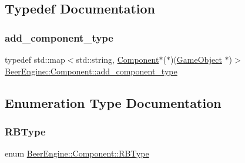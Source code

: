 \subsection{Typedef Documentation}
\mbox{\label{namespace_beer_engine_1_1_component_a58109916ff3e951c90c1dcd5ebba359b}} 
\subsubsection{\texorpdfstring{add\+\_\+component\+\_\+type}{add\_component\_type}}
{\footnotesize\ttfamily typedef std\+::map$<$std\+::string, \mbox{\hyperlink{class_beer_engine_1_1_component_1_1_component}{Component}}$\ast$($\ast$)(\mbox{\hyperlink{class_beer_engine_1_1_game_object}{Game\+Object}} $\ast$)$>$ \mbox{\hyperlink{namespace_beer_engine_1_1_component_a58109916ff3e951c90c1dcd5ebba359b}{Beer\+Engine\+::\+Component\+::add\+\_\+component\+\_\+type}}}



\subsection{Enumeration Type Documentation}
\mbox{\label{namespace_beer_engine_1_1_component_a2cfe279cc309b6420e792597940b8a33}} 
\subsubsection{\texorpdfstring{R\+B\+Type}{RBType}}
{\footnotesize\ttfamily enum \mbox{\hyperlink{namespace_beer_engine_1_1_component_a2cfe279cc309b6420e792597940b8a33}{Beer\+Engine\+::\+Component\+::\+R\+B\+Type}}}

